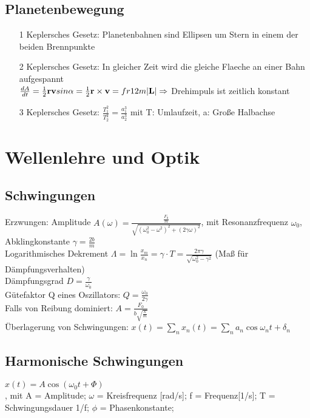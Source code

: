 \documentclass[fs, footer]{latex4ei}
\begin{document}
\begin{multicols*}{4}
\subsection{Planetenbewegung}
\begin{itemize}
\item[1] Keplersches Gesetz: Planetenbahnen sind Ellipsen um Stern in einem der beiden Brennpunkte\\
\item[2] Keplersches Gesetz: In gleicher Zeit wird die gleiche Flaeche an einer Bahn aufgespannt\\$\frac{dA}{dt} = \frac{1}{2} \textbf{r} \textbf{v} sin \alpha = \frac{1}{2}\textbf{r} \times \textbf{v} = fr{1}{2m}|\textbf{L}| \Rightarrow$ Drehimpuls ist zeitlich konstant\\
\item[3] Keplersches Gesetz: $\frac{T_1^2}{T_2^2} = \frac{a_1^3}{a_2^3}$ mit T: Umlaufzeit, a: Große Halbachse\\
\end{itemize}

\section{Wellenlehre und Optik}
\subsection{Schwingungen}
Erzwungen: Amplitude $A(\omega) = \frac{\frac{F_0}{m}}{\sqrt{(\omega_0^2 - \omega^2)^2+ (2\gamma\omega)^2}}$, mit Resonanzfrequenz $\omega_0$, Abklingkonstante $\gamma = \frac{2b}{m}$\\

Logarithmisches Dekrement $\Lambda = \ln\frac{x_m}{x_n}=\gamma\cdot T = \frac{2\pi\gamma}{\sqrt{\omega_0^2 - \gamma^2}}$ (Maß für Dämpfungsverhalten)\\
Dämpfungsgrad $D = \frac{\gamma}{\omega_0}$\\
Gütefaktor Q eines Oszillators: $Q = \frac{\omega_0}{2\gamma}$\\

Falls von Reibung dominiert: $A = \frac{F_0}{b\sqrt{\frac{k}{m}}}$\\
Überlagerung von Schwingungen: $x(t)=\sum_nx_n(t)=\sum_na_n\cos{\omega_nt+\delta_n}$\\
\subsection{Harmonische Schwingungen} $x(t) = A \cos(\omega_0t + \Phi)$\\, mit A = Amplitude; $\omega$ = Kreisfrequenz [rad/s]; f = Frequenz[1/s]; T = Schwingungsdauer 1/f; $\phi$ = Phasenkonstante;\\

\end{multicols*}
\end{document}
